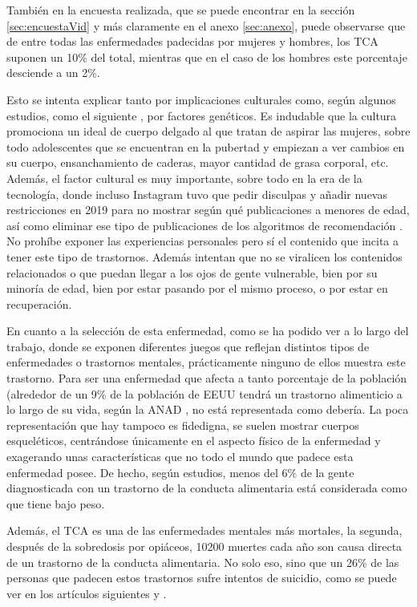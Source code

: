 \documentclass[12pt, a4paper,twoside,titlepage]{book}
\begin{document}
\begin{itemize}
{     También en la encuesta realizada, que se puede encontrar en la sección \ref{sec:encuestaVid} y más claramente en el anexo \ref{sec:anexo}, puede observarse que de entre todas las enfermedades padecidas por mujeres y hombres, los TCA suponen un 10\% del total, mientras que en el caso de los hombres este porcentaje desciende a un 2\%. 
     
    Esto se intenta explicar tanto por implicaciones culturales como, según algunos estudios, como el siguiente \cite{articuloTCA3}, por factores genéticos. Es indudable que la cultura promociona un ideal de cuerpo delgado al que tratan de aspirar las mujeres, sobre todo adolescentes que se encuentran en la pubertad y empiezan a ver cambios en su cuerpo, ensanchamiento de caderas, mayor cantidad de grasa corporal, etc. Además, el factor cultural es muy importante, sobre todo en la era de la tecnología, donde incluso Instagram tuvo que pedir disculpas y añadir nuevas restricciones en 2019 para no mostrar según qué publicaciones a menores de edad, así como eliminar ese tipo de publicaciones de los algoritmos de recomendación \cite{articuloTCA4}. No prohíbe exponer las experiencias personales pero sí el contenido que incita a tener este tipo de trastornos. Además intentan que no se viralicen los contenidos relacionados o que puedan llegar a los ojos de gente vulnerable, bien por su minoría de edad, bien por estar pasando por el mismo proceso, o por estar en recuperación. 
    
    En cuanto a la selección de esta enfermedad, como se ha podido ver a lo largo del trabajo, donde se exponen diferentes juegos que reflejan distintos tipos de enfermedades o trastornos mentales, prácticamente ninguno de ellos muestra este trastorno. Para ser una enfermedad que afecta a tanto porcentaje de la población (alrededor de un 9\% de la población de EEUU tendrá un trastorno alimenticio a lo largo de su vida, según la ANAD \cite{articuloTCA5}, no está representada como debería. La poca representación que hay tampoco es fidedigna, se suelen mostrar cuerpos esqueléticos, centrándose únicamente en el aspecto físico de la enfermedad y exagerando unas características que no todo el mundo que padece esta enfermedad posee. De hecho, según estudios, menos del 6\% de la gente diagnosticada con un trastorno de la conducta alimentaria está considerada como que tiene bajo peso. 
    
    Además, el TCA es una de las enfermedades mentales más mortales, la segunda, después de la sobredosis por opiáceos, 10200 muertes cada año son causa directa de un trastorno de la conducta alimentaria. No solo eso, sino que un 26\% de las personas que padecen estos trastornos sufre intentos de suicidio, como se puede ver en los artículos siguientes \cite{articuloTCA6} y \cite{articuloTCA7}. 
    
}
\end{itemize}
\end{document}
